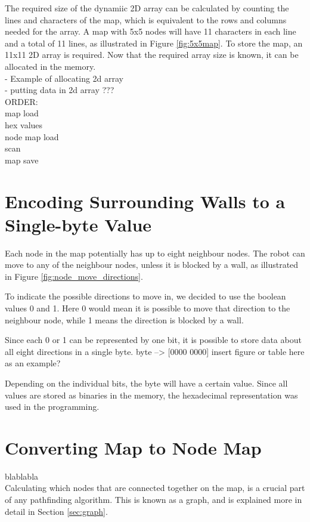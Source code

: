The required size of the dynamiic 2D array can be calculated by counting the lines and characters of the map,
which is equivalent to the rows and columns needed for the array.
A map with 5x5 nodes will have 11 characters in each line and a total of 11 lines,
as illustrated in Figure \ref{fig:5x5map}.
To store the map, an 11x11 2D array is required.
Now that the required array size is known, it can be allocated in the memory.\\
- Example of allocating 2d array\\
- putting data in 2d array ???\\

ORDER:\\
map load\\
hex values\\
node map load\\
scan\\
map save


\section{Encoding Surrounding Walls to a Single-byte Value}
\label{sec:map_hex} %
Each node in the map potentially has up to eight neighbour nodes. 
The robot can move to any of the neighbour nodes, unless it is blocked by a wall, as illustrated in Figure \ref{fig:node_move_directions}.

To indicate the possible directions to move in, we decided to use the boolean values 0 and 1. 
Here 0 would mean it is possible to move that direction to the neighbour node, while 1 means the direction is blocked by a wall.

Since each 0 or 1 can be represented by one bit, it is possible to store data about all eight directions in a single byte.
byte --> [0000 0000] insert figure or table here as an example?

Depending on the individual bits, the byte will have a certain value.
Since all values are stored as binaries in the memory, the hexadecimal representation was used in the programming.



\section{Converting Map to Node Map}
\label{sec:map_node} %
blablabla\\
Calculating which nodes that are connected together on the map, is a crucial part of any pathfinding algorithm. 
This is known as a graph, and is explained more in detail in Section \ref{sec:graph}. 

